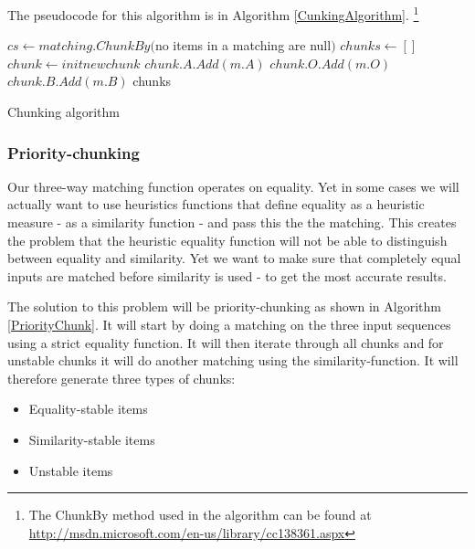 \documentclass[11pt]{article}
\begin{document}
The pseudocode for this algorithm is in Algorithm \ref{CunkingAlgorithm}. \footnote{The ChunkBy method used in the algorithm can be found at \url{http://msdn.microsoft.com/en-us/library/cc138361.aspx}}


\begin{algorithm}
\begin{algorithmic}
	\State $cs \gets matching.ChunkBy($no items in a matching are null$)$
	\State $chunks \gets []$
		\State $chunk \gets init new chunk$
				\State $chunk.A.Add(m.A)$
			\EndIf
				\State $chunk.O.Add(m.O)$
			\EndIf
				\State $chunk.B.Add(m.B)$
			\EndIf
		\EndFor
	\EndFor
	\State \Return chunks
\EndFunction
\end{algorithmic}
\caption{Chunking algorithm}
  \label{CunkingAlgorithm}
\end{algorithm}


\subsubsection{Priority-chunking}
\label{PriorityDiff}
Our three-way matching function operates on equality. Yet in some cases we will actually want to use heuristics functions that define equality as a heuristic measure - as a similarity function - and pass this the the matching. This creates the problem that the heuristic equality function will not be able to distinguish between equality and similarity. Yet we want to make sure that completely equal inputs are matched before similarity is used - to get the most accurate results.

The solution to this problem will be priority-chunking as shown in Algorithm \ref{PriorityChunk}. It will start by doing a matching on the three input sequences using a strict equality function. It will then iterate through all chunks and for unstable chunks it will do another matching using the similarity-function. It will therefore generate three types of chunks:

\begin{itemize}
   \item Equality-stable items
   \item Similarity-stable items
   \item Unstable items
\end{itemize}
\end{document}
